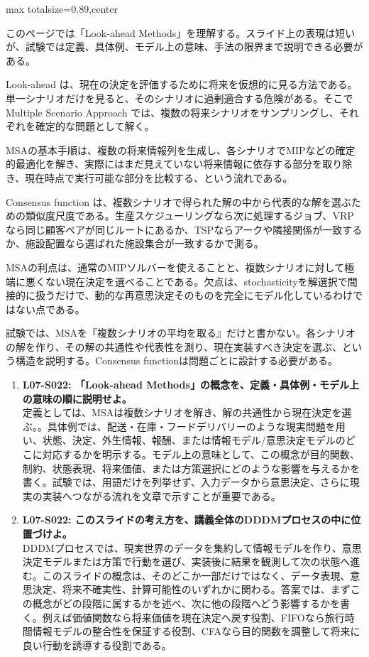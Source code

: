 \begin{minipage}[t]{0.58\textwidth}
\begin{adjustbox}{max totalsize={\textwidth}{0.89\textheight},center}
\begin{minipage}{\textwidth}\scriptsize
{}このページでは「Look-ahead Methods」を理解する。スライド上の表現は短いが、試験では定義、具体例、モデル上の意味、手法の限界まで説明できる必要がある。\par
Look-ahead は、現在の決定を評価するために将来を仮想的に見る方法である。単一シナリオだけを見ると、そのシナリオに過剰適合する危険がある。そこで Multiple Scenario Approach では、複数の将来シナリオをサンプリングし、それぞれを確定的な問題として解く。\par
MSAの基本手順は、複数の将来情報列を生成し、各シナリオでMIPなどの確定的最適化を解き、実際にはまだ見えていない将来情報に依存する部分を取り除き、現在時点で実行可能な部分を比較する、という流れである。\par
Consensus function は、複数シナリオで得られた解の中から代表的な解を選ぶための類似度尺度である。生産スケジューリングなら次に処理するジョブ、VRPなら同じ顧客ペアが同じルートにあるか、TSPならアークや隣接関係が一致するか、施設配置なら選ばれた施設集合が一致するかで測る。\par
MSAの利点は、通常のMIPソルバーを使えることと、複数シナリオに対して極端に悪くない現在決定を選べることである。欠点は、stochasticityを解選択で間接的に扱うだけで、動的な再意思決定そのものを完全にモデル化しているわけではない点である。\par
試験では、MSAを『複数シナリオの平均を取る』だけと書かない。各シナリオの解を作り、その解の共通性や代表性を測り、現在実装すべき決定を選ぶ、という構造を説明する。Consensus functionは問題ごとに設計する必要がある。\par{}\begin{enumerate}\item \textbf{L07-S022: 「Look-ahead Methods」の概念を、定義・具体例・モデル上の意味の順に説明せよ。}\\定義としては、MSAは複数シナリオを解き、解の共通性から現在決定を選ぶ。。具体例では、配送・在庫・フードデリバリーのような現実問題を用い、状態、決定、外生情報、報酬、または情報モデル/意思決定モデルのどこに対応するかを明示する。モデル上の意味として、この概念が目的関数、制約、状態表現、将来価値、または方策選択にどのような影響を与えるかを書く。試験では、用語だけを列挙せず、入力データから意思決定、さらに現実の実装へつながる流れを文章で示すことが重要である。\item \textbf{L07-S022: このスライドの考え方を、講義全体のDDDMプロセスの中に位置づけよ。}\\DDDMプロセスでは、現実世界のデータを集約して情報モデルを作り、意思決定モデルまたは方策で行動を選び、実装後に結果を観測して次の状態へ進む。このスライドの概念は、そのどこか一部だけではなく、データ表現、意思決定、将来不確実性、計算可能性のいずれかに関わる。答案では、まずこの概念がどの段階に属するかを述べ、次に他の段階へどう影響するかを書く。例えば価値関数なら将来価値を現在決定へ戻す役割、FIFOなら旅行時間情報モデルの整合性を保証する役割、CFAなら目的関数を調整して将来に良い行動を誘導する役割である。\end{enumerate}

\end{minipage}
\end{adjustbox}
\end{minipage}
